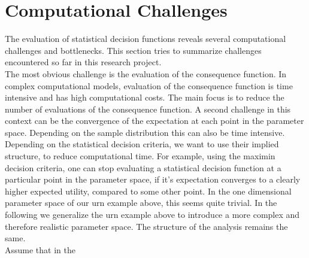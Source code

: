 \section{Computational Challenges}
The evaluation of statistical decision functions reveals several computational challenges and bottlenecks. This section tries to summarize challenges encountered so far in this research project.\\

The most obvious challenge is the evaluation of the consequence function. In complex computational models, evaluation of the consequence function is time intensive and has high computational costs. The main focus is to reduce the number of evaluations of the consequence function. A second challenge in this context can be the convergence of the expectation at each point in the parameter space. Depending on the sample distribution this can also be time intensive.\\

Depending on the statistical decision criteria, we want to use their implied structure, to reduce computational time. For example, using the maximin decision criteria, one can stop evaluating a statistical decision function at a particular point in the parameter space, if it's expectation converges to a clearly higher expected utility, compared to some other point. In the one dimensional parameter space of our urn example above, this seems quite trivial. In the following we generalize the urn example above to introduce a more complex and therefore realistic parameter space. The structure of the analysis remains the same.\\

Assume that in the 
